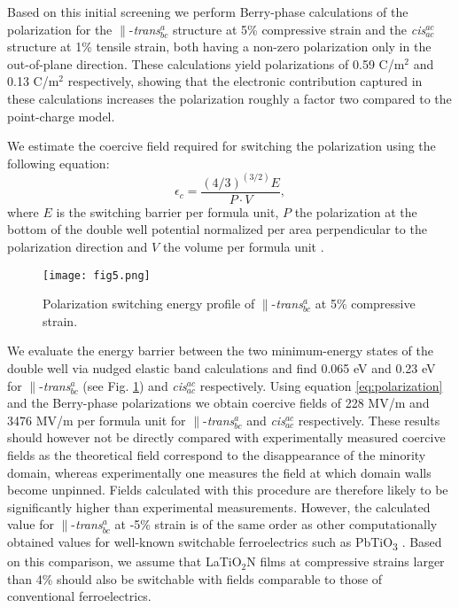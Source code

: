 \documentclass[prl,reprint,aps,twocolumn]{revtex4-1}
\begin{document}
Based on this initial screening we perform Berry-phase calculations of
the polarization for the $\parallel$-\textit{trans}$_{bc}^{a}$ structure at 5\% compressive strain and the \textit{cis}$^{ac}_{ac}$ structure at 1\% tensile strain, both having a non-zero polarization only in the out-of-plane direction.
These calculations yield polarizations of 0.59 C/m$^2$ and  0.13 C/m$^2$ respectively, showing that the electronic contribution captured in these calculations increases the polarization roughly a factor two compared to the point-charge model.

We estimate the coercive field required for switching the polarization using the following equation:
\begin{equation}
\epsilon_c = \frac{(4/3)^{(3/2)}E}{P \cdot V},
\label{eq:polarization}
\end{equation}
where $E$ is the switching barrier per formula unit, $P$ the polarization at the bottom of the double well potential  normalized per area perpendicular to the polarization direction and $V$
the volume per formula unit \cite{rabe2007physics, beckman2009ideal}.

\begin{figure}
\centering
  \texttt{[image: fig5.png]}
  \caption{Polarization switching energy profile of $\parallel$-\textit{trans}$_{bc}^{a}$ at 5\% compressive strain.}
 \label{fig:neb}
\end{figure}

We evaluate the energy barrier between the two minimum-energy states of the double well via nudged elastic band calculations and find 0.065 eV and 0.23 eV for $\parallel$-\textit{trans}$_{bc}^{a}$ (see Fig. \ref{fig:neb}) and \textit{cis}$^{ac}_{ac}$ respectively. Using equation \ref{eq:polarization} and the Berry-phase polarizations we obtain coercive fields of 228 MV/m and 3476 MV/m per formula unit for $\parallel$-\textit{trans}$_{bc}^{a}$ and \textit{cis}$^{ac}_{ac}$ respectively. These results should however not be directly compared with experimentally measured coercive fields 
as the theoretical field correspond to the disappearance of the minority domain, whereas experimentally one measures the field at which domain walls become unpinned.
Fields calculated with this procedure are therefore likely to be significantly higher than experimental measurements. 
However, the calculated value for $\parallel$-\textit{trans}$_{bc}^{a}$ at -5\% strain is of the same order as other computationally obtained values for well-known switchable ferroelectrics such as PbTiO\textsubscript{3} \cite{beckman2009ideal}. Based on this comparison, we assume that LaTiO$_2$N films at compressive strains larger than 4\% should also be switchable with fields comparable to those of conventional ferroelectrics.
\end{document}
